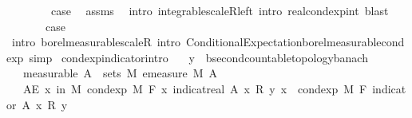 \begin{isabellebody}
\isanewline
\ \ \isamarkupfalse%
\ {}\isanewline
\ \ \isamarkupfalse%
\ {\isacharquery}{\kern0pt}case\ \isamarkupfalse%
\ assms\ \isamarkupfalse%
\ {\isacharparenleft}{\kern0pt}intro\ integrable{\isacharunderscore}{\kern0pt}scaleR{\isacharunderscore}{\kern0pt}left{\isacharcomma}{\kern0pt}\ intro\ real{\isacharunderscore}{\kern0pt}cond{\isacharunderscore}{\kern0pt}exp{\isacharunderscore}{\kern0pt}int{\isacharcomma}{\kern0pt}\ blast{\isacharplus}{\kern0pt}{\isacharparenright}{\kern0pt}\isanewline
{}\isamarkupfalse%
\isanewline
\ \ \isamarkupfalse%
\ {}\isanewline
\ \ \isamarkupfalse%
\ \isamarkupfalse%
\ {\isacharquery}{\kern0pt}case\ \isamarkupfalse%
\ {\isacharparenleft}{\kern0pt}intro\ borel{\isacharunderscore}{\kern0pt}measurable{\isacharunderscore}{\kern0pt}scaleR{\isacharcomma}{\kern0pt}\ intro\ Conditional{\isacharunderscore}{\kern0pt}Expectation{\isachardot}{\kern0pt}borel{\isacharunderscore}{\kern0pt}measurable{\isacharunderscore}{\kern0pt}cond{\isacharunderscore}{\kern0pt}exp{\isacharcomma}{\kern0pt}\ simp{\isacharparenright}{\kern0pt}\isanewline
{}\isamarkupfalse%
%
\endisatagproof
{\isafoldproof}%
%
\isadelimproof
\isanewline
%
\endisadelimproof
\isanewline
{}\isamarkupfalse%
\ cond{\isacharunderscore}{\kern0pt}exp{\isacharunderscore}{\kern0pt}indicator{\isacharbrackleft}{\kern0pt}intro{\isacharbrackright}{\kern0pt}{\isacharcolon}{\kern0pt}\isanewline
\ \ \ y\ {\isacharcolon}{\kern0pt}{\isacharcolon}{\kern0pt}\ {\isachardoublequoteopen}{\isacharprime}{\kern0pt}b{\isacharcolon}{\kern0pt}{\isacharcolon}{\kern0pt}{\isacharbraceleft}{\kern0pt}second{\isacharunderscore}{\kern0pt}countable{\isacharunderscore}{\kern0pt}topology{\isacharcomma}{\kern0pt}banach{\isacharbraceright}{\kern0pt}{\isachardoublequoteclose}\isanewline
\ \ \ {\isacharbrackleft}{\kern0pt}measurable{\isacharbrackright}{\kern0pt}{\isacharcolon}{\kern0pt}\ {\isachardoublequoteopen}A\ {\isasymin}\ sets\ M{\isachardoublequoteclose}\ {\isachardoublequoteopen}emeasure\ M\ A\ {\isacharless}{\kern0pt}\ {\isasyminfinity}{\isachardoublequoteclose}\isanewline
\ \ \ {\isachardoublequoteopen}AE\ x\ in\ M{\isachardot}{\kern0pt}\ cond{\isacharunderscore}{\kern0pt}exp\ M\ F\ {\isacharparenleft}{\kern0pt}{\isasymlambda}x{\isachardot}{\kern0pt}\ indicat{\isacharunderscore}{\kern0pt}real\ A\ x\ {\isacharasterisk}{\kern0pt}\isactrlsub R\ y{\isacharparenright}{\kern0pt}\ x\ {\isacharequal}{\kern0pt}\ cond{\isacharunderscore}{\kern0pt}exp\ M\ F\ {\isacharparenleft}{\kern0pt}indicator\ A{\isacharparenright}{\kern0pt}\ x\ {\isacharasterisk}{\kern0pt}\isactrlsub R\ y{\isachardoublequoteclose}\isanewline

\end{isabellebody}
